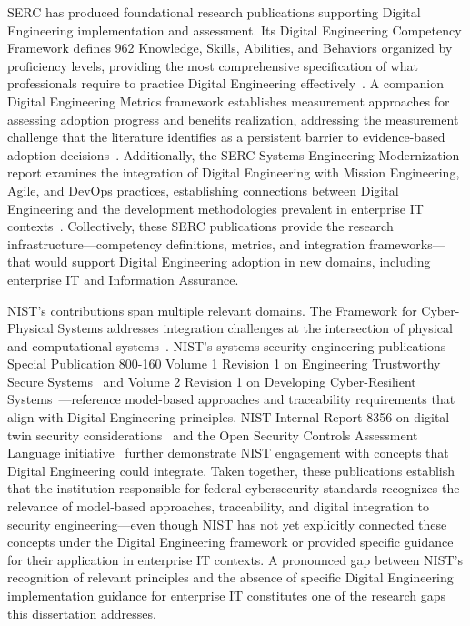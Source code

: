 SERC has produced foundational research publications supporting Digital Engineering implementation and assessment. Its Digital Engineering Competency Framework defines 962 Knowledge, Skills, Abilities, and Behaviors organized by proficiency levels, providing the most comprehensive specification of what professionals require to practice Digital Engineering effectively~\parencite{Hutchinson_2021}. A companion Digital Engineering Metrics framework establishes measurement approaches for assessing adoption progress and benefits realization, addressing the measurement challenge that the literature identifies as a persistent barrier to evidence-based adoption decisions~\parencite{Hutchison_2020}. Additionally, the SERC Systems Engineering Modernization report examines the integration of Digital Engineering with Mission Engineering, Agile, and DevOps practices, establishing connections between Digital Engineering and the development methodologies prevalent in enterprise IT contexts~\parencite{SERC_SE_Modernization_2022}. Collectively, these SERC publications provide the research infrastructure---competency definitions, metrics, and integration frameworks---that would support Digital Engineering adoption in new domains, including enterprise IT and Information Assurance.

NIST's contributions span multiple relevant domains. The Framework for Cyber-Physical Systems addresses integration challenges at the intersection of physical and computational systems~\parencite{NIST_CPS_Framework_2017}. NIST's systems security engineering publications---Special Publication 800-160 Volume 1 Revision 1 on Engineering Trustworthy Secure Systems~\parencite{Ross_Winstead_McEvilley_2022} and Volume 2 Revision 1 on Developing Cyber-Resilient Systems~\parencite{NIST_SP_800_160_V2_2021}---reference model-based approaches and traceability requirements that align with Digital Engineering principles. NIST Internal Report 8356 on digital twin security considerations~\parencite{NIST_IR_8356_2025} and the Open Security Controls Assessment Language initiative~\parencite{NIST_OSCAL_2023} further demonstrate NIST engagement with concepts that Digital Engineering could integrate. Taken together, these publications establish that the institution responsible for federal cybersecurity standards recognizes the relevance of model-based approaches, traceability, and digital integration to security engineering---even though NIST has not yet explicitly connected these concepts under the Digital Engineering framework or provided specific guidance for their application in enterprise IT contexts. A pronounced gap between NIST's recognition of relevant principles and the absence of specific Digital Engineering implementation guidance for enterprise IT constitutes one of the research gaps this dissertation addresses.

